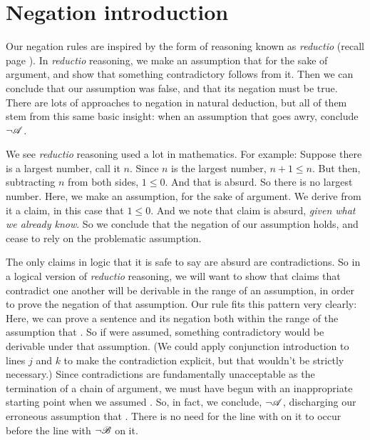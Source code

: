 \section{Negation introduction}\label{negint}

Our negation rules are inspired by the form of reasoning known as \emph{reductio} (recall page \pageref{reductio}). In \emph{reductio} reasoning, we make an assumption that  for the sake of argument, and show that something contradictory follows from it. Then we can conclude that our assumption was false, and that its negation must be true. There are lots of approaches to negation in natural deduction, but all of them stem from this same basic insight: when an assumption that  goes awry, conclude $\neg \mathscr{A}$.

We see \emph{reductio} reasoning used a lot in mathematics. For example: Suppose there is a largest number, call it $n$. Since $n$ is the largest number, $n+1 \leqslant n$. But then, subtracting $n$ from both sides, $1 \leqslant 0$. And that is absurd. So there is no largest number. Here, we make an assumption, for the sake of argument. We derive from it a claim, in this case that $1 \leqslant 0$. And we note that claim is absurd, \emph{given what we already know}. So we conclude that the negation of our assumption holds, and cease to rely on the problematic assumption.

The only claims in logic that it is safe to say are absurd are contradictions. So in a logical version of \emph{reductio} reasoning, we will want to show that claims that contradict one another will be derivable in the range of an assumption, in order to prove the negation of that assumption. Our  rule fits this pattern very clearly:  Here, we can prove a sentence and its negation both within the range of the assumption that . So if  were assumed, something contradictory would be derivable under that assumption. (We could apply conjunction introduction to lines $j$ and $k$ to make the contradiction explicit, but that wouldn't be strictly necessary.) Since contradictions are fundamentally unacceptable as the termination of a chain of argument, we must have begun with an inappropriate starting point when we assumed . So, in fact, we conclude, $\neg \mathscr{A}$, discharging our erroneous assumption that . There is no need for the line with  on it to occur before the line with $\neg\mathscr{B}$ on it.

